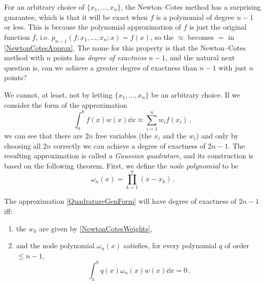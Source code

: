 For an arbitrary choice of $\{x_1, \dots, x_n\}$, the Newton--Cotes method has a surprising guarantee, which is that it will be exact when $f$ is a polynomial of degree $n-1$ or less. This is because the polynomial approximation of $f$ is just the original function $f$, i.e. $p_{n-1}(f; x_1, \dots, x_n; x) = f(x)$, so the $\approx$ becomes $=$ in \eqref{NewtonCotesApprox}. The name for this property is that the Newton--Cotes method with $n$ points has \emph{degree of exactness} $n-1$, and the natural next question is, can we achieve a greater degree of exactness than $n-1$ with just $n$ points?

We cannot, at least, not by letting $\{x_1, \dots, x_n\}$ be an arbitrary choice. If we consider the form of the approximation
\begin{equation} \label{QuadratureGenForm}
	\int_a^b f(x) w(x) \dd x \approx \sum_{i=1}^n w_i f(x_i) \,,
\end{equation}
we can see that there are $2n$ free variables (the $x_i$ and the $w_i$) and only by choosing all $2n$ correctly we can achieve a degree of exactness of $2n-1$. The resulting approximation is called a \emph{Gaussian quadrature}, and its construction is based on the following theorem. First, we define the \emph{node polynomial} to be
\begin{equation} \label{NodePolynomial}
	\omega_n(x) = \prod_{k=1}^n (x - x_k) \,.
\end{equation}

\begin{theorem} \label{thm:GaussianQuadrature}
The approximation \eqref{QuadratureGenForm} will have degree of exactness of $2n -1$ iff:
\begin{enumerate}
\item the $w_k$ are given by \eqref{NewtonCotesWeights},
\item and the node polynomial $\omega_n(x)$ satisfies, for every polynomial $q$ of order $\le n-1$,
\begin{equation} \label{NodePolynomialOrthogonal}
	\int_{a}^b q(x) \omega_n(x) w(x) \dd x = 0  \,.
\end{equation}
\end{enumerate}
\end{theorem}

